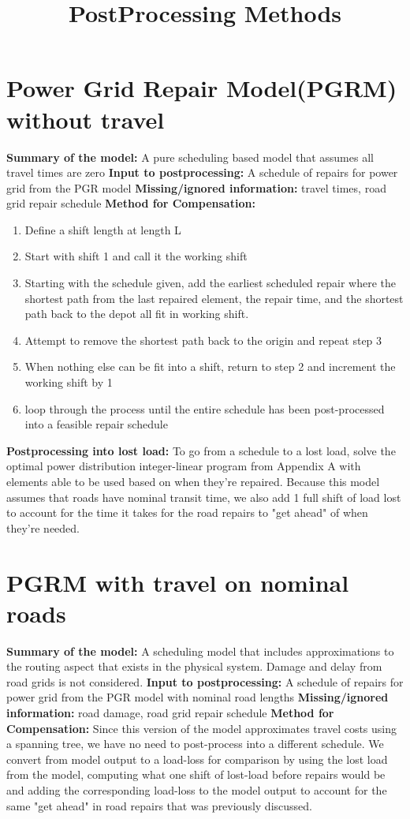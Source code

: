 \documentclass{article}
\begin{document}
	\title{PostProcessing Methods}
	\section{Power Grid Repair Model(PGRM) without travel}
	\textbf{Summary of the model:} A pure scheduling based model that assumes all travel times are zero
	\textbf{Input to postprocessing:} A schedule of repairs for power grid from the PGR model\newline
	\textbf{Missing/ignored information:} travel times, road grid repair schedule\newline
	\textbf{Method for Compensation:}
	\begin{enumerate}
		\item Define a shift length at length L
		\item Start with shift 1 and call it the working shift
		\item Starting with the schedule given, add the earliest scheduled repair where the shortest path from the last repaired element, the repair time, and the shortest path back to the depot all fit in working shift.
		\item Attempt to remove the shortest path back to the origin and repeat step 3
		\item When nothing else can be fit into a shift, return to step 2 and increment the working shift by 1
		\item loop through the process until the entire schedule has been post-processed into a feasible repair schedule 
	\end{enumerate}
\textbf{Postprocessing into lost load:} To go from a schedule to a lost load, solve the optimal power distribution integer-linear program from Appendix A with elements able to be used based on when they're repaired. Because this model assumes that roads have nominal transit time, we also add 1 full shift of load lost to account for the time it takes for the road repairs to "get ahead" of when they're needed.

\section{PGRM with travel on nominal roads}
\textbf{Summary of the model:} A scheduling model that includes approximations to the routing aspect that exists in the physical system. Damage and delay from road grids is not considered.
	\textbf{Input to postprocessing:} A schedule of repairs for power grid from the PGR model with nominal road lengths\newline
\textbf{Missing/ignored information:} road damage, road grid repair schedule\newline
\textbf{Method for Compensation:}
Since this version of the model approximates travel costs using a spanning tree, we have no need to post-process into a different schedule. We convert from model output to a load-loss for comparison by using the lost load from the model, computing what one shift of lost-load before repairs would be and adding the corresponding load-loss to the model output to account for the same "get ahead" in road repairs that was previously discussed.
\end{document}
